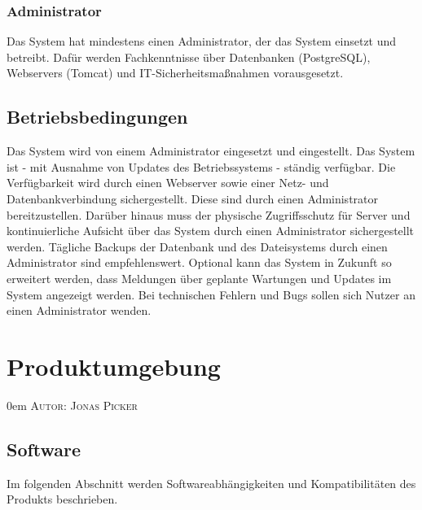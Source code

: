 \documentclass{article}
\makeatletter
\newcommand{\sectionauthor}[1]{
	{\parindent 0em \large \scshape Autor: #1 \par \nobreak \vspace*{2em}}
	\@afterheading
}
\makeatother
\begin{document}
\subsubsection{Administrator}
Das System hat mindestens einen Administrator, der das System einsetzt und betreibt. Dafür werden Fachkenntnisse über Datenbanken (PostgreSQL), Webservers (Tomcat) und \linebreak IT-Sicherheitsmaßnahmen vorausgesetzt.
\subsection{Betriebsbedingungen}
Das System wird von einem Administrator eingesetzt und eingestellt. Das System ist - mit Ausnahme von Updates des Betriebssystems - ständig verfügbar. Die Verfügbarkeit wird durch einen Webserver sowie einer Netz- und Datenbankverbindung sichergestellt. Diese sind durch einen Administrator bereitzustellen. Darüber hinaus muss der physische Zugriffsschutz für Server und kontinuierliche Aufsicht über das System durch einen Administrator sichergestellt werden. Tägliche Backups der Datenbank und des Dateisystems durch einen Administrator sind empfehlenswert. Optional kann das System in Zukunft so erweitert werden, dass Meldungen über geplante Wartungen und Updates im System angezeigt werden. Bei technischen Fehlern und Bugs sollen sich Nutzer an einen Administrator wenden.

\section{Produktumgebung} %
\sectionauthor{Jonas Picker}

\subsection{Software}

Im folgenden Abschnitt werden Softwareabhängigkeiten und Kompatibilitäten des Produkts beschrieben.
\end{document}
